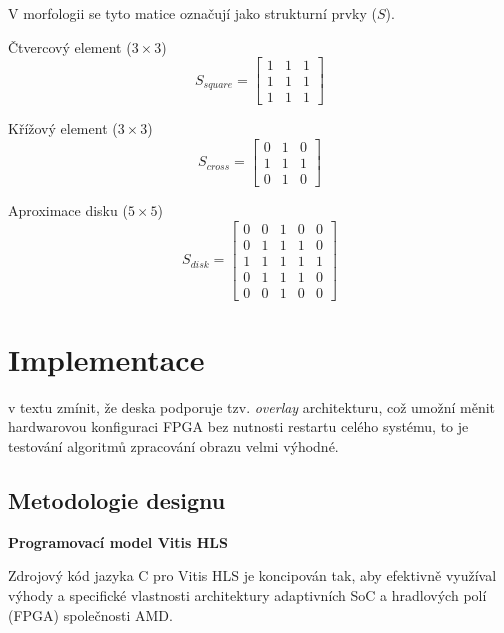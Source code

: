 V morfologii se tyto matice označují jako strukturní prvky ($S$).

Čtvercový element ($3 \times 3$)
\begin{equation}
    S_{square} = \begin{bmatrix}
        1 & 1 & 1 \\
        1 & 1 & 1 \\
        1 & 1 & 1
    \end{bmatrix}
\end{equation}

Křížový element ($3 \times 3$)
\begin{equation}
    S_{cross} = \begin{bmatrix}
        0 & 1 & 0 \\
        1 & 1 & 1 \\
        0 & 1 & 0
    \end{bmatrix}
\end{equation}

Aproximace disku ($5 \times 5$)
\begin{equation}
    S_{disk} = \begin{bmatrix}
        0 & 0 & 1 & 0 & 0 \\
        0 & 1 & 1 & 1 & 0 \\
        1 & 1 & 1 & 1 & 1 \\
        0 & 1 & 1 & 1 & 0 \\
        0 & 0 & 1 & 0 & 0
    \end{bmatrix}
\end{equation}


\chapter{Implementace}
v textu zmínit, že deska podporuje tzv. \textit{overlay} architekturu, což  umožní měnit hardwarovou konfiguraci FPGA bez nutnosti restartu celého systému, to je testování algoritmů zpracování obrazu velmi výhodné. 

\section{Metodologie designu}
\textbf{Programovací model Vitis HLS}

Zdrojový kód jazyka C pro Vitis HLS je koncipován tak, aby efektivně využíval výhody a specifické vlastnosti architektury adaptivních SoC a hradlových polí (FPGA) společnosti AMD.

